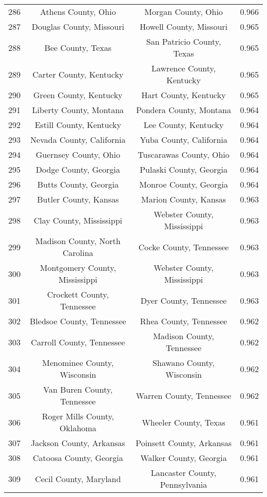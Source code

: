 \begin{longtable}{cccc}
  286 & Athens County, Ohio & Morgan County, Ohio & 0.966 \\ 
  287 & Douglas County, Missouri & Howell County, Missouri & 0.965 \\ 
  288 & Bee County, Texas & San Patricio County, Texas & 0.965 \\ 
  289 & Carter County, Kentucky & Lawrence County, Kentucky & 0.965 \\ 
  290 & Green County, Kentucky & Hart County, Kentucky & 0.965 \\ 
  291 & Liberty County, Montana & Pondera County, Montana & 0.964 \\ 
  292 & Estill County, Kentucky & Lee County, Kentucky & 0.964 \\ 
  293 & Nevada County, California & Yuba County, California & 0.964 \\ 
  294 & Guernsey County, Ohio & Tuscarawas County, Ohio & 0.964 \\ 
  295 & Dodge County, Georgia & Pulaski County, Georgia & 0.964 \\ 
  296 & Butts County, Georgia & Monroe County, Georgia & 0.964 \\ 
  297 & Butler County, Kansas & Marion County, Kansas & 0.963 \\ 
  298 & Clay County, Mississippi & Webster County, Mississippi & 0.963 \\ 
  299 & Madison County, North Carolina & Cocke County, Tennessee & 0.963 \\ 
  300 & Montgomery County, Mississippi & Webster County, Mississippi & 0.963 \\ 
  301 & Crockett County, Tennessee & Dyer County, Tennessee & 0.963 \\ 
  302 & Bledsoe County, Tennessee & Rhea County, Tennessee & 0.962 \\ 
  303 & Carroll County, Tennessee & Madison County, Tennessee & 0.962 \\ 
  304 & Menominee County, Wisconsin & Shawano County, Wisconsin & 0.962 \\ 
  305 & Van Buren County, Tennessee & Warren County, Tennessee & 0.962 \\ 
  306 & Roger Mills County, Oklahoma & Wheeler County, Texas & 0.961 \\ 
  307 & Jackson County, Arkansas & Poinsett County, Arkansas & 0.961 \\ 
  308 & Catoosa County, Georgia & Walker County, Georgia & 0.961 \\ 
  309 & Cecil County, Maryland & Lancaster County, Pennsylvania & 0.961 \\ 

\end{longtable}
